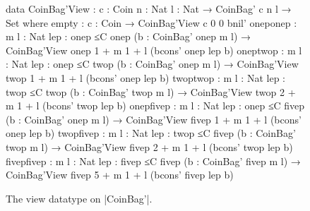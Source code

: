 \begin{figure}
\codefigure
\begin{code}
data CoinBag'View : {c : Coin} {n : Nat} {l : Nat} → CoinBag' c n l → Set where
  empty       : {c : Coin} → CoinBag'View {c} {0} {0} bnil'
  oneponep    : {m l : Nat} {lep : onep ≤C onep} (b : CoinBag' onep m l) → CoinBag'View {onep} {1 + m} {1 + l} (bcons' onep lep b)
  oneptwop    : {m l : Nat} {lep : onep ≤C twop} (b : CoinBag' onep m l) → CoinBag'View {twop} {1 + m} {1 + l} (bcons' onep lep b)
  twoptwop    : {m l : Nat} {lep : twop ≤C twop} (b : CoinBag' twop m l) → CoinBag'View {twop} {2 + m} {1 + l} (bcons' twop lep b)
  onepfivep   : {m l : Nat} {lep : onep ≤C fivep} (b : CoinBag' onep m l) → CoinBag'View {fivep} {1 + m} {1 + l} (bcons' onep lep b)
  twopfivep   : {m l : Nat} {lep : twop ≤C fivep} (b : CoinBag' twop m l) → CoinBag'View {fivep} {2 + m} {1 + l} (bcons' twop lep b)
  fivepfivep  : {m l : Nat} {lep : fivep ≤C fivep} (b : CoinBag' fivep m l) → CoinBag'View {fivep} {5 + m} {1 + l} (bcons' fivep lep b)
\end{code}
\caption{The view datatype on |CoinBag'|.}
\label{fig:CoinBag'View}
\end{figure}

